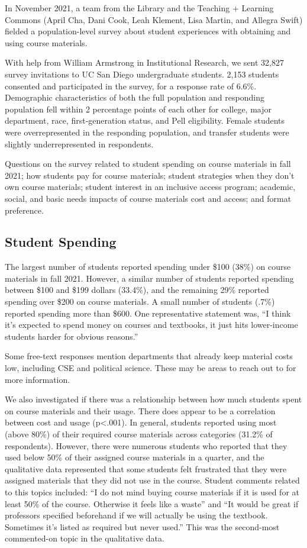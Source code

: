 \documentclass[
  letterpaper,
  DIV=11,
  numbers=noendperiod]{scrreprt}
\begin{document}
In November 2021, a team from the Library and the Teaching + Learning
Commons (April Cha, Dani Cook, Leah Klement, Lisa Martin, and Allegra
Swift) fielded a population-level survey about student experiences with
obtaining and using course materials.

With help from William Armstrong in Institutional Research, we sent
32,827 survey invitations to UC San Diego undergraduate students. 2,153
students consented and participated in the survey, for a response rate
of 6.6\%. Demographic characteristics of both the full population and
responding population fell within 2 percentage points of each other for
college, major department, race, first-generation status, and Pell
eligibility. Female students were overrepresented in the responding
population, and transfer students were slightly underrepresented in
respondents.

Questions on the survey related to student spending on course materials
in fall 2021; how students pay for course materials; student strategies
when they don't own course materials; student interest in an inclusive
access program; academic, social, and basic needs impacts of course
materials cost and access; and format preference.

\hypertarget{student-spending}{%
\subsection{Student Spending}\label{student-spending}}

The largest number of students reported spending under \$100 (38\%) on
course materials in fall 2021. However, a similar number of students
reported spending between \$100 and \$199 dollars (33.4\%), and the
remaining 29\% reported spending over \$200 on course materials. A small
number of students (.7\%) reported spending more than \$600. One
representative statement was, ``I think it's expected to spend money on
courses and textbooks, it just hits lower-income students harder for
obvious reasons.''

Some free-text responses mention departments that already keep material
costs low, including CSE and political science. These may be areas to
reach out to for more information.

We also investigated if there was a relationship between how much
students spent on course materials and their usage. There does appear to
be a correlation between cost and usage (p\textless.001). In general,
students reported using most (above 80\%) of their required course
materials across categories (31.2\% of respondents). However, there were
numerous students who reported that they used below 50\% of their
assigned course materials in a quarter, and the qualitative data
represented that some students felt frustrated that they were assigned
materials that they did not use in the course. Student comments related
to this topics included: ``I do not mind buying course materials if it
is used for at least 50\% of the course. Otherwise it feels like a
waste'' and ``It would be great if professors specified beforehand if we
will actually be using the textbook. Sometimes it's listed as required
but never used.'' This was the second-most commented-on topic in the
qualitative data.
\end{document}
